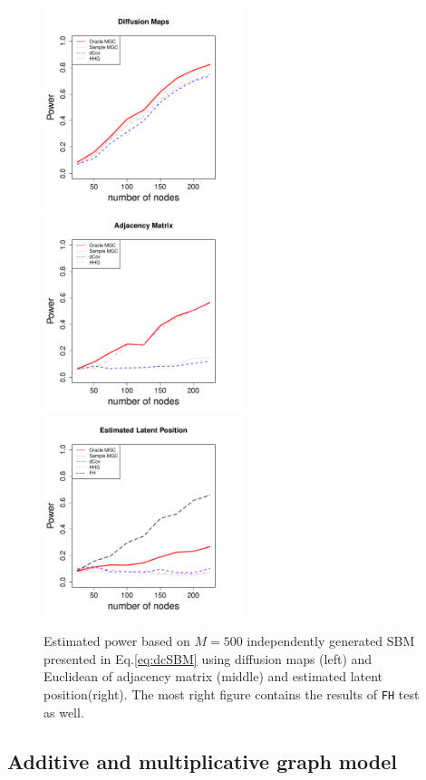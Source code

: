 \documentclass[12pt]{article}
\theoremstyle{definition}
\begin{document}
\begin{figure}[H]
	\centering
	\label{fig:dcSBM}
	\includegraphics[width=2.3in]{../Figure/dcSBM.pdf}
	\includegraphics[width=2.3in]{../Figure/EdcSBM.pdf}
	\includegraphics[width =2.3in]{../Figure/fdcSBM.pdf}
	\caption{Estimated power based on $M = 500$ independently generated SBM presented in Eq.\ref{eq:dcSBM} using diffusion maps (left) and Euclidean of adjacency matrix (middle)  and estimated latent position(right). The most right figure contains the results of \texttt{FH} test as well.}
\end{figure}	
	
\subsection{Additive and multiplicative graph model}
\end{document}
